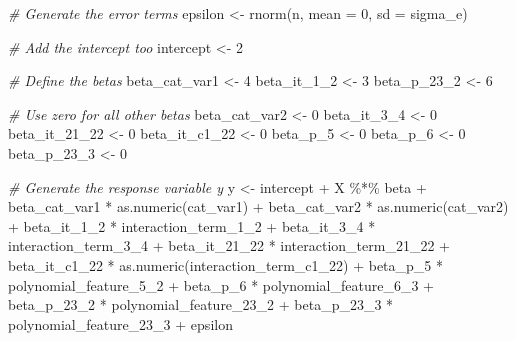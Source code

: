 \documentclass[
  11pt,
]{article}
\newenvironment{Shaded}{}{}
\newcommand{\AttributeTok}[1]{\textcolor[rgb]{0.49,0.56,0.16}{#1}}
\newcommand{\CommentTok}[1]{\textcolor[rgb]{0.38,0.63,0.69}{\textit{#1}}}
\newcommand{\DecValTok}[1]{\textcolor[rgb]{0.25,0.63,0.44}{#1}}
\newcommand{\FunctionTok}[1]{\textcolor[rgb]{0.02,0.16,0.49}{#1}}
\newcommand{\NormalTok}[1]{#1}
\newcommand{\OtherTok}[1]{\textcolor[rgb]{0.00,0.44,0.13}{#1}}
\newcommand{\SpecialCharTok}[1]{\textcolor[rgb]{0.25,0.44,0.63}{#1}}
\begin{document}
\begin{Shaded}
\begin{Highlighting}[]
  \CommentTok{\# Generate the error terms}
\NormalTok{  epsilon }\OtherTok{\textless{}{-}} \FunctionTok{rnorm}\NormalTok{(n, }\AttributeTok{mean =} \DecValTok{0}\NormalTok{, }\AttributeTok{sd =}\NormalTok{ sigma\_e)}
  
  \CommentTok{\# Add the intercept too}
\NormalTok{  intercept }\OtherTok{\textless{}{-}} \DecValTok{2}
  
  \CommentTok{\# Define the betas}
\NormalTok{  beta\_cat\_var1 }\OtherTok{\textless{}{-}} \DecValTok{4}
\NormalTok{  beta\_it\_1\_2 }\OtherTok{\textless{}{-}} \DecValTok{3}
\NormalTok{  beta\_p\_23\_2 }\OtherTok{\textless{}{-}} \DecValTok{6}
  
  \CommentTok{\# Use zero for all other betas}
\NormalTok{  beta\_cat\_var2 }\OtherTok{\textless{}{-}} \DecValTok{0}
\NormalTok{  beta\_it\_3\_4 }\OtherTok{\textless{}{-}} \DecValTok{0}
\NormalTok{  beta\_it\_21\_22 }\OtherTok{\textless{}{-}} \DecValTok{0}
\NormalTok{  beta\_it\_c1\_22 }\OtherTok{\textless{}{-}} \DecValTok{0}
\NormalTok{  beta\_p\_5 }\OtherTok{\textless{}{-}} \DecValTok{0}
\NormalTok{  beta\_p\_6 }\OtherTok{\textless{}{-}} \DecValTok{0}
\NormalTok{  beta\_p\_23\_3 }\OtherTok{\textless{}{-}} \DecValTok{0}
  
  \CommentTok{\# Generate the response variable y}
\NormalTok{  y }\OtherTok{\textless{}{-}}\NormalTok{ intercept }\SpecialCharTok{+}\NormalTok{ X }\SpecialCharTok{\%*\%}\NormalTok{ beta }\SpecialCharTok{+} 
\NormalTok{    beta\_cat\_var1 }\SpecialCharTok{*} \FunctionTok{as.numeric}\NormalTok{(cat\_var1) }\SpecialCharTok{+} 
\NormalTok{    beta\_cat\_var2 }\SpecialCharTok{*} \FunctionTok{as.numeric}\NormalTok{(cat\_var2) }\SpecialCharTok{+} 
\NormalTok{    beta\_it\_1\_2 }\SpecialCharTok{*}\NormalTok{ interaction\_term\_1\_2 }\SpecialCharTok{+} 
\NormalTok{    beta\_it\_3\_4 }\SpecialCharTok{*}\NormalTok{ interaction\_term\_3\_4 }\SpecialCharTok{+} 
\NormalTok{    beta\_it\_21\_22 }\SpecialCharTok{*}\NormalTok{ interaction\_term\_21\_22 }\SpecialCharTok{+} 
\NormalTok{    beta\_it\_c1\_22 }\SpecialCharTok{*} \FunctionTok{as.numeric}\NormalTok{(interaction\_term\_c1\_22) }\SpecialCharTok{+}
\NormalTok{    beta\_p\_5 }\SpecialCharTok{*}\NormalTok{ polynomial\_feature\_5\_2 }\SpecialCharTok{+} 
\NormalTok{    beta\_p\_6 }\SpecialCharTok{*}\NormalTok{ polynomial\_feature\_6\_3 }\SpecialCharTok{+} 
\NormalTok{    beta\_p\_23\_2 }\SpecialCharTok{*}\NormalTok{ polynomial\_feature\_23\_2 }\SpecialCharTok{+}
\NormalTok{    beta\_p\_23\_3 }\SpecialCharTok{*}\NormalTok{ polynomial\_feature\_23\_3 }\SpecialCharTok{+}
\NormalTok{    epsilon}
  

\end{Highlighting}
\end{Shaded}
\end{document}
